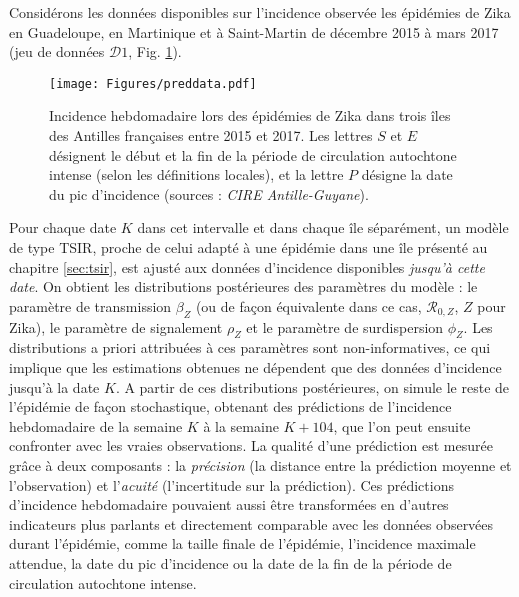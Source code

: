 Considérons les données disponibles sur l'incidence observée les épidémies de Zika en Guadeloupe, en Martinique et à Saint-Martin de décembre 2015 à mars 2017 (jeu de données $\mathcal{D}1$, Fig. \ref{fig:preddata}).
\begin{figure}[t]
	\centering
	\texttt{[image: Figures/preddata.pdf]}
	\caption{Incidence hebdomadaire lors des épidémies de Zika dans trois îles des Antilles françaises entre 2015 et 2017. Les lettres $S$ et $E$ désignent le début et la fin de la période de circulation autochtone intense (selon les définitions locales), et la lettre $P$ désigne la date du pic d'incidence (sources : {\em CIRE Antille-Guyane}).}
	\label{fig:preddata}
\end{figure}
Pour chaque date $K$ dans cet intervalle et dans chaque île séparément, un modèle de type TSIR, proche de celui adapté à une épidémie dans une île présenté au chapitre \ref{sec:tsir}, est ajusté aux données d'incidence disponibles {\em jusqu'à cette date}.
On obtient les distributions postérieures des paramètres du modèle : le paramètre de transmission $\beta_Z$ (ou de façon équivalente dans ce cas, $\mathcal{R}_{0,Z}$, $Z$ pour Zika), le paramètre de signalement $\rho_Z$ et le paramètre de surdispersion $\phi_Z$.
Les distributions a priori attribuées à ces paramètres sont non-informatives, ce qui implique que les estimations obtenues ne dépendent que des données d'incidence jusqu'à la date $K$. 
A partir de ces distributions postérieures, on simule le reste de l'épidémie de façon stochastique, obtenant des prédictions de l'incidence hebdomadaire de la semaine $K$ à la semaine $K+104$, que l'on peut ensuite confronter avec les vraies observations.
La qualité d'une prédiction est mesurée grâce à deux composants : la {\em précision} (la distance entre la prédiction moyenne et l'observation) et l'{\em acuité} (l'incertitude sur la prédiction).
Ces prédictions d'incidence hebdomadaire pouvaient aussi être transformées en d'autres indicateurs plus parlants et directement comparable avec les données observées durant l'épidémie, comme la taille finale de l'épidémie, l'incidence maximale attendue, la date du pic d'incidence ou la date de la fin de la période de circulation autochtone intense.

